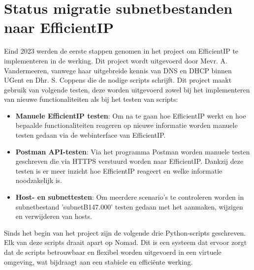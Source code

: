 \section{Status migratie subnetbestanden naar EfficientIP}
\label{premigratie}
Eind 2023 werden de eerste stappen genomen in het project om EfficientIP te implementeren in de werking. Dit project wordt uitgevoerd door Mevr. A. Vandermeeren, vanwege haar uitgebreide kennis van DNS en DHCP binnen UGent en Dhr. S. Coppens die de nodige scripts schrijft.
Dit project maakt gebruik van volgende testen, deze worden uitgevoerd zowel bij het implementeren van nieuwe functionaliteiten als bij het testen van scripts:
\begin{itemize}
    \item \textbf{Manuele EfficientIP testen}: Om na te gaan hoe EfficientIP werkt en hoe bepaalde functionaliteiten reageren op nieuwe informatie worden manuele testen gedaan via de webinterface van EfficientIP.
    \item \textbf{Postman API-testen}: Via het programma Postman worden manuele testen geschreven die via HTTPS verstuurd worden naar EfficientIP. Dankzij deze testen is er meer inzicht hoe EfficientIP reageert en welke informatie noodzakelijk is.
    \item \textbf{Host- en subnettesten}: Om meerdere scenario's te controleren worden in subnetbestand 'subnetB147.000' testen gedaan met het aanmaken, wijzigen en verwijderen van hosts.
\end{itemize}
Sinds het begin van het project zijn de volgende drie Python-scripts geschreven. Elk van deze scripts draait apart op Nomad. Dit is een systeem dat ervoor zorgt dat de scripts betrouwbaar en flexibel worden uitgevoerd in een virtuele omgeving, wat bijdraagt aan een stabiele en efficiënte werking.

